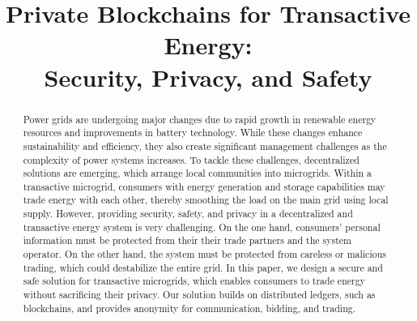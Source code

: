 \documentclass[chi_draft]{sigchi}
\def\plaintitle{Private Blockchains for Transactive Energy:\\Security, Privacy, and Safety}
\begin{document}
\title{\plaintitle}

\author{%
}

\maketitle

\begin{abstract}
Power grids are undergoing major changes due to rapid growth in renewable energy resources and improvements in battery technology.
While these changes enhance sustainability and efficiency, they also create significant management challenges as the complexity of power systems increases.
To tackle these challenges, decentralized solutions are emerging, which arrange local communities into microgrids.
Within a transactive microgrid, consumers with energy generation and storage capabilities may trade energy with each other, thereby smoothing the load on the main grid using local supply.
However, providing security, safety, and privacy in a decentralized and transactive energy system is very challenging.
On the one hand, consumers' personal information must be protected from their their trade partners and the system operator.
On the other hand, the system must be protected from careless or malicious trading, which could destabilize the entire grid. 
In this paper, we design a secure and safe solution for transactive microgrids, which enables consumers to trade energy without sacrificing their privacy.
Our solution builds on distributed ledgers, such as blockchains, and provides anonymity for communication, bidding, and trading.
\end{abstract}
\end{document}

